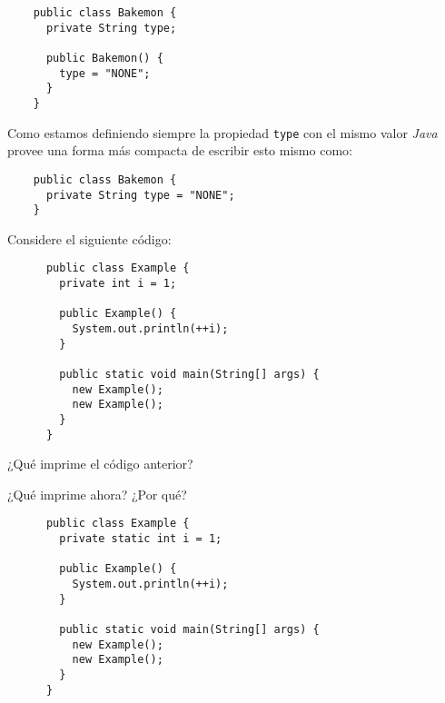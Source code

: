   \begin{verbatim}
    public class Bakemon {
      private String type;

      public Bakemon() {
        type = "NONE";
      }
    }
  \end{verbatim}

  Como estamos definiendo siempre la propiedad \texttt{type} con el mismo valor \textit{Java} provee
  una forma más compacta de escribir esto mismo como:

  \begin{verbatim}
    public class Bakemon {
      private String type = "NONE";
    }
  \end{verbatim}

  \begin{exercise}
    Considere el siguiente código:

    \begin{verbatim}
      public class Example {
        private int i = 1;

        public Example() {
          System.out.println(++i);
        }

        public static void main(String[] args) {
          new Example();
          new Example();
        }
      }
    \end{verbatim}

    ¿Qué imprime el código anterior?
  \end{exercise}

  \begin{exercise}
    ¿Qué imprime ahora? ¿Por qué?

    \begin{verbatim}
      public class Example {
        private static int i = 1;

        public Example() {
          System.out.println(++i);
        }

        public static void main(String[] args) {
          new Example();
          new Example();
        }
      }
    \end{verbatim}
  \end{exercise}